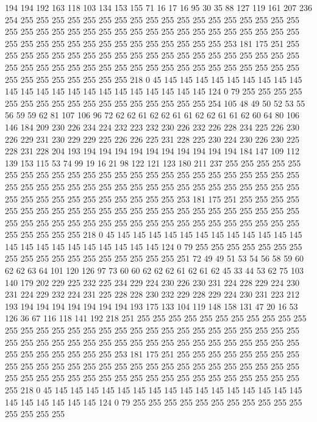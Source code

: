 194 194 192 163 118 103 134 153 155 71 16 17 16 95 30 35 88 127 119 161
207 236 254 255 255 255 255 255 255 255 255 255 255 255 255 255 255 255 255 255
255 255 255 255 255 255 255 255 255 255 255 255 255 255 255 255 255 255 255 255
255 255 255 255 255 255 255 255 255 255 255 255 255 255 253 181 175 251 255 255
255 255 255 255 255 255 255 255 255 255 255 255 255 255 255 255 255 255 255 255
255 255 255 255 255 255 255 255 255 255 255 255 255 255 255 255 255 255 255 255
255 255 255 255 255 218 0 45 145 145 145 145 145 145 145 145 145 145 145 145
145 145 145 145 145 145 145 145 145 145 124 0 79 255 255 255 255 255 255 255
255 255 255 255 255 255 255 255 255 255 254 105 48 49 50 52 53 55 56 59
59 62 81 107 106 96 72 62 62 61 62 62 61 61 62 62 61 61 62 60
64 80 106 146 184 209 230 226 234 224 232 223 232 230 226 232 226 228 234 225
226 230 226 229 231 230 229 229 225 226 226 225 231 228 225 230 224 230 226 230
225 228 231 228 204 193 194 194 194 194 194 194 194 194 194 194 184 147 109 112
139 153 115 53 74 99 19 16 21 98 122 121 123 180 211 237 255 255 255 255
255 255 255 255 255 255 255 255 255 255 255 255 255 255 255 255 255 255 255 255
255 255 255 255 255 255 255 255 255 255 255 255 255 255 255 255 255 255 255 255
255 255 255 255 255 255 255 255 255 255 253 181 175 251 255 255 255 255 255 255
255 255 255 255 255 255 255 255 255 255 255 255 255 255 255 255 255 255 255 255
255 255 255 255 255 255 255 255 255 255 255 255 255 255 255 255 255 255 255 255
255 218 0 45 145 145 145 145 145 145 145 145 145 145 145 145 145 145 145 145
145 145 145 145 145 145 124 0 79 255 255 255 255 255 255 255 255 255 255 255
255 255 255 255 255 255 255 251 72 49 49 51 53 54 56 58 59 60 62 62
63 64 101 120 126 97 73 60 60 62 62 62 61 62 61 62 45 33 44 53
62 75 103 140 179 202 229 225 232 225 234 229 224 230 226 230 231 224 228 229
224 230 231 224 229 232 224 231 225 228 228 230 232 229 228 229 224 230 231 223
212 193 194 194 194 194 194 194 194 193 175 133 104 119 148 158 131 47 20 16
53 126 36 67 116 118 141 192 218 251 255 255 255 255 255 255 255 255 255 255
255 255 255 255 255 255 255 255 255 255 255 255 255 255 255 255 255 255 255 255
255 255 255 255 255 255 255 255 255 255 255 255 255 255 255 255 255 255 255 255
255 255 255 255 255 255 253 181 175 251 255 255 255 255 255 255 255 255 255 255
255 255 255 255 255 255 255 255 255 255 255 255 255 255 255 255 255 255 255 255
255 255 255 255 255 255 255 255 255 255 255 255 255 255 255 255 255 218 0 45
145 145 145 145 145 145 145 145 145 145 145 145 145 145 145 145 145 145 145 145
145 145 124 0 79 255 255 255 255 255 255 255 255 255 255 255 255 255 255 255
